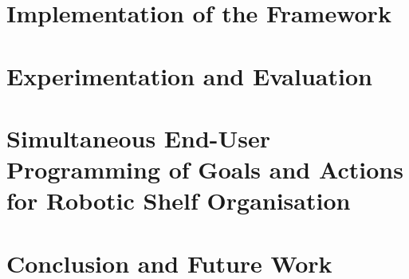\documentclass[a4paper,12pt,twoside,openany]{book}
\theoremstyle{definition}
\theoremstyle{remark}
\begin{document}
\chapter{Implementation of the Framework}\label{chap:Implementation}
\minitoc%


\chapter{Experimentation and Evaluation}\label{chap:Evaluation}
\minitoc%




\chapter{Simultaneous End-User Programming of Goals and Actions for Robotic Shelf Organisation}\label{chap:OrganisingTasks}
\minitoc%



\chapter{Conclusion and Future Work}\label{chap:Conclusion}
\minitoc%



\clearpage



%
\end{document}
